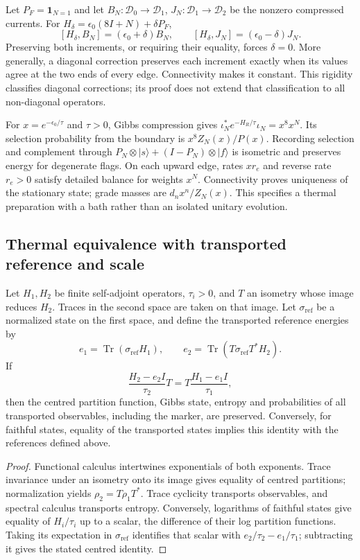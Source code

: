 Let $P_F=\mathbf1_{N=1}$ and let
$B_N:\mathcal D_0\to\mathcal D_1$, $J_N:\mathcal D_1\to\mathcal D_2$
be the nonzero compressed currents. For
$H_\delta=\epsilon_0(8I+N)+\delta P_F$,
\[
 [H_\delta,B_N]=(\epsilon_0+\delta)B_N,
 \qquad[H_\delta,J_N]=(\epsilon_0-\delta)J_N.
\]
Preserving both increments, or requiring their equality, forces
$\delta=0$. More generally, a diagonal correction preserves each
increment exactly when its values agree at the two ends of every edge.
Connectivity makes it constant. This rigidity classifies diagonal
corrections; its proof does not extend that classification to all
non-diagonal operators.

For $x=e^{-\epsilon_0/\tau}$ and $\tau>0$, Gibbs compression gives
$\iota_N^*e^{-H_R/\tau}\iota_N=x^8x^N$. Its selection probability
from the boundary is $x^8Z_N(x)/P(x)$. Recording selection and complement
through $P_N\otimes|s\rangle+(I-P_N)\otimes|f\rangle$ is isometric
and preserves energy for degenerate flags. On each upward edge, rates
$xr_e$ and reverse rate $r_e>0$ satisfy detailed balance for weights
$x^N$. Connectivity proves uniqueness of the stationary state; grade
masses are $d_nx^n/Z_N(x)$. This specifies a thermal preparation with
a bath rather than an isolated unitary evolution.

\subsection{Thermal equivalence with transported reference and scale}
\label{sec:ii-ter27-equivalencia}

\begin{theorem}
\label{thm:ii-ter27-transporte}
Let $H_1,H_2$ be finite self-adjoint operators, $\tau_i>0$, and $T$
an isometry whose image reduces $H_2$. Traces in the second space are
taken on that image. Let $\sigma_{\mathrm{ref}}$ be a normalized state
on the first space, and define the transported reference energies by
\[
 e_1=\operatorname{Tr}(\sigma_{\mathrm{ref}}H_1),\qquad
 e_2=\operatorname{Tr}(T\sigma_{\mathrm{ref}}T^*H_2).
\]
If
\[
 \frac{H_2-e_2I}{\tau_2}T
 =T\frac{H_1-e_1I}{\tau_1},
\]
then the centred partition function, Gibbs state, entropy and probabilities
of all transported observables, including the marker, are preserved.
Conversely, for faithful states, equality of the transported states
implies this identity with the references defined above.
\end{theorem}
\begin{proof}
Functional calculus intertwines exponentials of both exponents. Trace
invariance under an isometry onto its image gives equality of centred
partitions; normalization yields $\rho_2=T\rho_1T^*$. Trace cyclicity
transports observables, and spectral calculus transports entropy.
Conversely, logarithms of faithful states give equality of $H_i/\tau_i$
up to a scalar, the difference of their log partition functions.
Taking its expectation in $\sigma_{\mathrm{ref}}$ identifies that scalar
with $e_2/\tau_2-e_1/\tau_1$; subtracting it gives the stated centred identity.
\end{proof}

